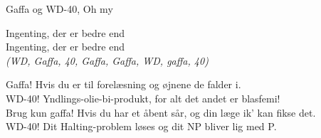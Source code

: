 \begin{song}{Gaffa og WD-40, Oh my}
  \begin{SBSection*}
    Ingenting, der er bedre end\\
    Ingenting, der er bedre end\\
    \emph{(WD, Gaffa, 40, Gaffa, Gaffa, WD, gaffa, 40)}
  \end{SBSection*}

  \begin{SBChorus}
    Gaffa! Hvis du er til forelæsning og øjnene de falder i.\\
    WD-40! Yndlings-olie-bi-produkt, for alt det andet er blasfemi!\\
    Brug kun gaffa! Hvis du har et åbent sår, og din læge ik’ kan fikse det.\\
    WD-40! Dit Halting-problem løses og dit NP bliver lig med P.
  \end{SBChorus}
\end{song}